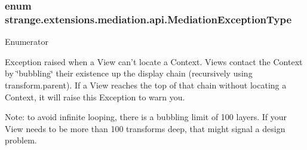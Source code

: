 \hypertarget{namespacestrange_1_1extensions_1_1mediation_1_1api_aef97993ec02a40c5f887dbfaf4f06e4a}{
\subsubsection[{Mediation\-Exception\-Type}]{\setlength{\rightskip}{0pt plus 5cm}enum {\bf strange.\-extensions.\-mediation.\-api.\-Mediation\-Exception\-Type}}}\label{namespacestrange_1_1extensions_1_1mediation_1_1api_aef97993ec02a40c5f887dbfaf4f06e4a}
\begin{Desc}
\item[Enumerator]\par
\begin{description}
\item[{\em 
\hypertarget{namespacestrange_1_1extensions_1_1mediation_1_1api_aef97993ec02a40c5f887dbfaf4f06e4aac89f949bb64ae5754bb687bf056de559}{N\-O\-\_\-\-C\-O\-N\-T\-E\-X\-T}\label{namespacestrange_1_1extensions_1_1mediation_1_1api_aef97993ec02a40c5f887dbfaf4f06e4aac89f949bb64ae5754bb687bf056de559}
}]Exception raised when a View can't locate a Context. Views contact the Context by \char`\"{}bubbling\char`\"{} their existence up the display chain (recursively using transform.\-parent). If a View reaches the top of that chain without locating a Context, it will raise this Exception to warn you.

Note\-: to avoid infinite looping, there is a bubbling limit of 100 layers. If your View needs to be more than 100 transforms deep, that might signal a design problem. \end{description}
\end{Desc}
